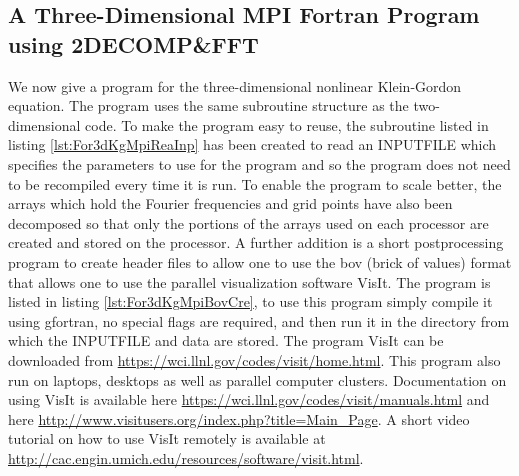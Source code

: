 







\subsection{A Three-Dimensional MPI Fortran Program using 2DECOMP\&FFT}

We now give a program for the three-dimensional nonlinear Klein-Gordon equation. The program uses the same subroutine structure as the two-dimensional code. To make the program easy to reuse, the subroutine listed in listing \ref{lst:For3dKgMpiReaInp} has been created to read an INPUTFILE which specifies the parameters to use for the program and so the program does not need to be recompiled every time it is run. To enable the program to scale better, the arrays which hold the Fourier frequencies and grid points have also been decomposed so that only the portions of the arrays used on each processor are created and stored on the processor. A further addition is a short postprocessing program to create header files to allow one to use the bov (brick of values) format that allows one to use the parallel visualization software VisIt. The program is listed in listing \ref{lst:For3dKgMpiBovCre}, to use this program simply compile it using gfortran, no special flags are required, and then run it in the directory from which the INPUTFILE and data are stored. The program VisIt can be downloaded from \url{https://wci.llnl.gov/codes/visit/home.html}. This program also run on laptops, desktops as well as parallel computer clusters. Documentation on using VisIt is available here \url{https://wci.llnl.gov/codes/visit/manuals.html} and here \url{http://www.visitusers.org/index.php?title=Main_Page}.  A short video tutorial on how to use VisIt remotely is available at \url{http://cac.engin.umich.edu/resources/software/visit.html}.

